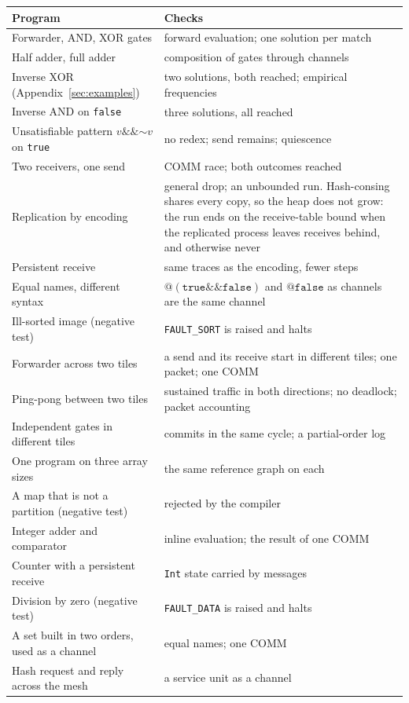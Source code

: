 \documentclass[11pt]{article}
\makeatletter
\newcommand{\kw}[1]{\texttt{#1}}
\newcommand{\tru}{\kw{true}}
\newcommand{\fls}{\kw{false}}
\newcommand{\bnot}{\mathord{\sim}}
\newcommand{\band}{\mathbin{\&\&}}
\newcommand{\quo}[1]{@#1}
\theoremstyle{definition}
\theoremstyle{remark}
\makeatother
\begin{document}
\noindent
\begin{tabularx}{\textwidth}{@{}l X@{}}
\toprule
Program & Checks\\
\midrule
Forwarder, AND, XOR gates & forward evaluation; one solution per match\\
Half adder, full adder & composition of gates through channels\\
Inverse XOR (Appendix~\ref{sec:examples}) & two solutions, both reached;
  empirical frequencies\\
Inverse AND on \fls & three solutions, all reached\\
Unsatisfiable pattern $v \band \bnot v$ on \tru & no redex; send remains;
  quiescence\\
Two receivers, one send & COMM race; both outcomes reached\\
Replication by encoding & general drop; an unbounded run. Hash-consing shares
  every copy, so the heap does not grow: the run ends on the receive-table
  bound when the replicated process leaves receives behind, and otherwise
  never\\
Persistent receive & same traces as the encoding, fewer steps\\
Equal names, different syntax & $\quo{(\tru \band \fls)}$ and $\quo{\fls}$
  as channels are the same channel\\
Ill-sorted image (negative test) & \kw{FAULT\_SORT} is raised and halts\\
Forwarder across two tiles & a send and its receive start in different
  tiles; one packet; one COMM\\
Ping-pong between two tiles & sustained traffic in both directions; no
  deadlock; packet accounting\\
Independent gates in different tiles & commits in the same cycle; a partial-order log\\
One program on three array sizes & the same reference graph on each\\
A map that is not a partition (negative test) & rejected by the compiler\\
Integer adder and comparator & inline evaluation; the result of one COMM\\
Counter with a persistent receive & \kw{Int} state carried by messages\\
Division by zero (negative test) & \kw{FAULT\_DATA} is raised and halts\\
A set built in two orders, used as a channel & equal names; one COMM\\
Hash request and reply across the mesh & a service unit as a channel\\
\bottomrule
\end{tabularx}
\end{document}
